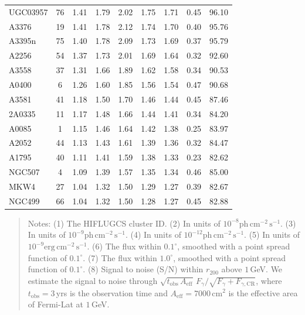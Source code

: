 \documentclass[10pt,aps,pra,reprint,amsmath,amsfonts,amssymb,showpacs,nofootinbib,floatfix]{revtex4-1}
\newcommand{\rmn}{\mathrm}
\newcommand{\cm}{\rmn{cm}}
\newcommand{\vstt}{\vspace{-0.0mm}}
\newcommand{\CR}{\rmn{CR}}
\newcommand{\rvir}{r_{200}}
\begin{document}
{\begin{table}
\begin{minipage}{2.0\columnwidth}
\begin{tabular}{l c c c c c c c c}
UGC03957 &  76 &   1.41 &   1.79 &   2.02 &   1.75 &   1.71 &   0.45 &  96.10 \vstt \\
A3376    &  19 &   1.41 &   1.78 &   2.12 &   1.74 &   1.70 &   0.40 &  95.76 \vstt \\
A3395n   &  75 &   1.40 &   1.78 &   2.09 &   1.73 &   1.69 &   0.37 &  95.79 \vstt \\
A2256    &  54 &   1.37 &   1.73 &   2.01 &   1.69 &   1.64 &   0.32 &  92.60 \vstt \\
A3558    &  37 &   1.31 &   1.66 &   1.89 &   1.62 &   1.58 &   0.34 &  90.53 \vstt \\
A0400    &   6 &   1.26 &   1.60 &   1.85 &   1.56 &   1.54 &   0.47 &  90.68 \vstt \\
A3581    &  41 &   1.18 &   1.50 &   1.70 &   1.46 &   1.44 &   0.45 &  87.46 \vstt \\
2A0335   &  11 &   1.17 &   1.48 &   1.66 &   1.44 &   1.41 &   0.34 &  84.20 \vstt \\
A0085    &   1 &   1.15 &   1.46 &   1.64 &   1.42 &   1.38 &   0.25 &  83.97 \vstt \\
A2052    &  44 &   1.13 &   1.43 &   1.61 &   1.39 &   1.36 &   0.32 &  84.47 \vstt \\
A1795    &  40 &   1.11 &   1.41 &   1.59 &   1.38 &   1.33 &   0.23 &  82.62 \vstt \\
NGC507   &   4 &   1.09 &   1.39 &   1.57 &   1.35 &   1.34 &   0.46 &  85.00 \vstt \\
MKW4     &  27 &   1.04 &   1.32 &   1.50 &   1.29 &   1.27 &   0.39 &  82.67 \vstt \\
NGC499   &  66 &   1.04 &   1.32 &   1.50 &   1.28 &   1.27 &   0.45 &  82.88 \vstt \\
\hline
\hline
\end{tabular}
\begin{quote}
  Notes:
   (1) The HIFLUGCS cluster ID.
   (2) In units of $10^{-8} \rmn{ph}\,\rmn{cm}^{-2}\,\rmn{s}^{-1}$.
   (3) In units of $10^{-9} \rmn{ph}\,\rmn{cm}^{-2}\,\rmn{s}^{-1}$.
   (4) In units of $10^{-12} \rmn{ph}\,\rmn{cm}^{-2}\,\rmn{s}^{-1}$.
   (5) In units of $10^{-9} \rmn{erg}\,\rmn{cm}^{-2}\,\rmn{s}^{-1}$.
   (6) The flux within $0.1^\circ$, smoothed with a point spread function of $0.1^\circ$.
   (7) The flux within $1.0^\circ$, smoothed with a point spread function of $0.1^\circ$.
   (8) Signal to noise (S/N) within $\rvir$ above $1\,$GeV. We estimate the signal to
  noise through $\sqrt{t_\rmn{obs}\,A_\rmn{eff}}\,F_{\gamma}/\sqrt{F_{\gamma}+F_{\gamma,\CR}}$,
  where $t_\rmn{obs}=3\,$yrs is the observation time and $A_\rmn{eff} = 7000\,\cm^2$
    is the effective area of Fermi-Lat at $1\,$GeV.
 \label{tab:flux_tab_LP}
  \end{quote}
\end{minipage}
\end{table}

}
\end{document}
